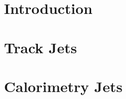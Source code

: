 \documentclass[12pt,twoside]{article}
\begin{document}
\linenumbers
\pagestyle{empty}




\setcounter{page}{1}



\tableofcontents


\renewcommand{\thepage}{\arabic{page}}

\section {Introduction}
\label{det_overview}


\section {Track Jets}
\label{section2}



\section{Calorimetry Jets}
\label{calo_jets}

\listoftodos[To Do]



\end{document}
